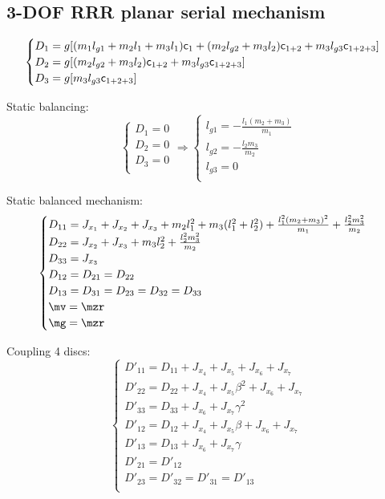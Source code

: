 \documentclass[a4paper,11pt,brazil,fleqn]{article}
\begin{document}
\subsection{3-DOF RRR planar serial mechanism}\label{S03-1}

\begin{equation}
\begin{cases}
D_1 = g[ (m_1 l_{g1} + m_2 l_1 + m_3 l_1 ) \mathsf{c}_1 + (m_2 l_{g2} + m_3 l_2) \mathsf{c}_{1+2} + m_3 l_{g3} \mathsf{c}_{1+2+3} ] \\
D_2 = g[  (m_2 l_{g2} + m_3 l_2) \mathsf{c}_{1+2} + m_3 l_{g3} \mathsf{c}_{1+2+3} ] \\
D_3 = g[   m_3 l_{g3} \mathsf{c}_{1+2+3} ] \\
\end{cases}
\end{equation} 

Static balancing:
\begin{equation}
\begin{cases}
D_1 = 0 \\
D_2 = 0 \\
D_3 = 0 \\
\end{cases}
\Rightarrow
\begin{cases}
l_{g1} = -\frac{l_1(m_2 + m_3)}{m_1} \\
l_{g2} = -\frac{l_2 m_3}{m_2} \\
l_{g3} = 0 \\
\end{cases}
\end{equation}

Static balanced mechanism:
\begin{equation}
\begin{cases}
D_{11} = J_{x_1} + J_{x_2} + J_{x_3} + m_2 l_1^2 + m_3 (l_1^2 + l_2^2) + \frac{l_1^2 (m_2 + m_3)^2}{m_1} + \frac{l_2^2 m_3^2}{m_2} \\
D_{22} = J_{x_2} + J_{x_3} + m_3 l_2^2 + \frac{l_2^2 m_3^2}{m_2} \\
D_{33} = J_{x_3} \\
D_{12} =  D_{21} = D_{22} \\
D_{13} = D_{31} = D_{23} = D_{32} = D_{33} \\
\mv = \mzr \\
\mg = \mzr
\end{cases}
\end{equation}

Coupling 4 discs:
\begin{equation}
\begin{cases}
D'_{11} = D_{11} + J_{x_4} + J_{x_5} + J_{x_6} + J_{x_7} \\
D'_{22} = D_{22} + J_{x_4} + J_{x_5} \beta^2 + J_{x_6} + J_{x_7} \\
D'_{33} = D_{33} + J_{x_6} + J_{x_7} \gamma^2 \\
D'_{12} = D_{12} + J_{x_4} + J_{x_5} \beta + J_{x_6} + J_{x_7} \\
D'_{13} = D_{13} + J_{x_6} + J_{x_7} \gamma  \\
D'_{21} = D'_{12} \\
D'_{23} = D'_{32} = D'_{31} = D'_{13}\\
\end{cases}
\end{equation}
\end{document}
